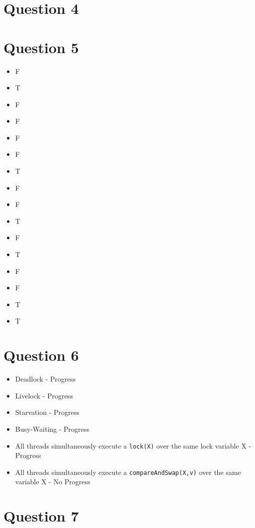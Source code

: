 \documentclass[a4paper,twocolumn]{article}
\begin{document}
\section{Question 4}
\section{Question 5}
\begin{itemize}
    \item F
    \item T
    \item F
    \item F
    \item F
    \item F
    \item T
    \item F
    \item F
    \item T
    \item F
    \item T
    \item F
    \item F
    \item T
    \item T
\end{itemize}
\section{Question 6}
\begin{itemize}
    \item Deadlock - Progress
    \item Livelock - Progress
    \item Starvation - Progress
    \item Busy-Waiting - Progress
    \item All threads simultaneously execute a \texttt{lock(X)} over the same lock variable X - Progress
    \item All threads simultaneously execute a \texttt{compareAndSwap(X,v)} over the same variable X - No Progress
\end{itemize}
\section{Question 7}
\end{document}
